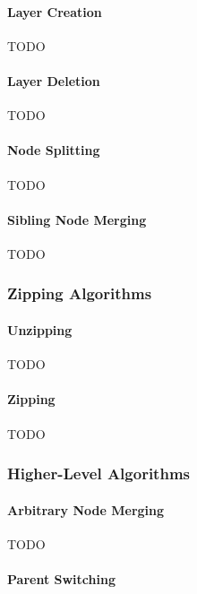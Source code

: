 \paragraph{Layer Creation}

TODO

\paragraph{Layer Deletion}

TODO

\paragraph{Node Splitting}

TODO

\paragraph{Sibling Node Merging}

TODO

\subsubsection{Zipping Algorithms}

\paragraph{Unzipping}

TODO

\paragraph{Zipping}

TODO

\subsubsection{Higher-Level Algorithms}

\paragraph{Arbitrary Node Merging}

TODO

\paragraph{Parent Switching}

